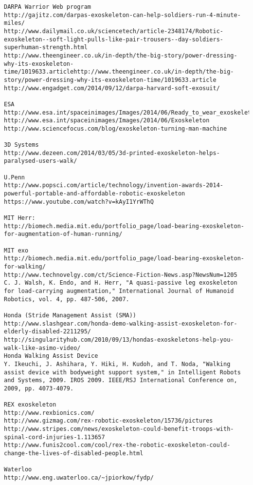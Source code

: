 \documentclass[letterpaper,12pt,fullpage]{article}
\begin{document}
\begin{verbatim}
DARPA Warrior Web program
http://gajitz.com/darpas-exoskeleton-can-help-soldiers-run-4-minute-miles/
http://www.dailymail.co.uk/sciencetech/article-2348174/Robotic-exoskeleton--soft-light-pulls-like-pair-trousers--day-soldiers-superhuman-strength.html
http://www.theengineer.co.uk/in-depth/the-big-story/power-dressing-why-its-exoskeleton-time/1019633.articlehttp://www.theengineer.co.uk/in-depth/the-big-story/power-dressing-why-its-exoskeleton-time/1019633.article
http://www.engadget.com/2014/09/12/darpa-harvard-soft-exosuit/

ESA
http://www.esa.int/spaceinimages/Images/2014/06/Ready_to_wear_exoskeleton
http://www.esa.int/spaceinimages/Images/2014/06/Exoskeleton
http://www.sciencefocus.com/blog/exoskeleton-turning-man-machine

3D Systems
http://www.dezeen.com/2014/03/05/3d-printed-exoskeleton-helps-paralysed-users-walk/

U.Penn
http://www.popsci.com/article/technology/invention-awards-2014-powerful-portable-and-affordable-robotic-exoskeleton
https://www.youtube.com/watch?v=kAyI1YrWThQ

MIT Herr:
http://biomech.media.mit.edu/portfolio_page/load-bearing-exoskeleton-for-augmentation-of-human-running/

MIT exo
http://biomech.media.mit.edu/portfolio_page/load-bearing-exoskeleton-for-walking/
http://www.technovelgy.com/ct/Science-Fiction-News.asp?NewsNum=1205
C. J. Walsh, K. Endo, and H. Herr, "A quasi-passive leg exoskeleton
for load-carrying augmentation," International Journal of Humanoid
Robotics, vol. 4, pp. 487-506, 2007.

Honda (Stride Management Assist (SMA))
http://www.slashgear.com/honda-demo-walking-assist-exoskeleton-for-elderly-disabled-2211295/
http://singularityhub.com/2010/09/13/hondas-exoskeletons-help-you-walk-like-asimo-video/
Honda Walking Assist Device
Y. Ikeuchi, J. Ashihara, Y. Hiki, H. Kudoh, and T. Noda, "Walking
assist device with bodyweight support system," in Intelligent Robots
and Systems, 2009. IROS 2009. IEEE/RSJ International Conference on,
2009, pp. 4073-4079.

REX exoskeleton
http://www.rexbionics.com/
http://www.gizmag.com/rex-robotic-exoskeleton/15736/pictures
http://www.stripes.com/news/exoskeleton-could-benefit-troops-with-spinal-cord-injuries-1.113657
http://www.funis2cool.com/cool/rex-the-robotic-exoskeleton-could-change-the-lives-of-disabled-people.html

Waterloo
http://www.eng.uwaterloo.ca/~jpiorkow/fydp/


\end{verbatim}
\end{document}
